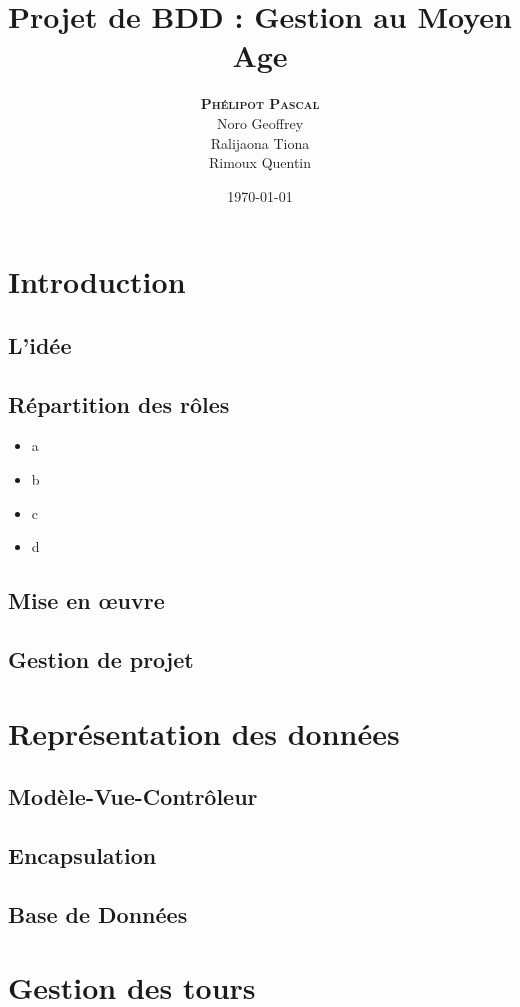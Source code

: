 \documentclass[11pt,a4paper]{article}
\author{\textsc{\textbf{Phélipot Pascal}}\\Noro Geoffrey\\Ralijaona Tiona\\Rimoux Quentin}
\title{Projet de BDD : Gestion au Moyen Age}
\date\today
\begin{document}
\maketitle
\pagestyle{plain}
\newpage{}
\tableofcontents

\newpage{}
\section{Introduction}
\subsection{L'idée}

\subsection{Répartition des rôles}
\begin{itemize}
	\item a 
	\item b
	\item c
	\item d
\end{itemize}
\subsection{Mise en œuvre}
\subsection{Gestion de projet}

\newpage\section{Représentation des données}
\subsection{Modèle-Vue-Contrôleur}
\subsection{Encapsulation}
\subsection{Base de Données}

\newpage\section{Gestion des tours}
\end{document}
